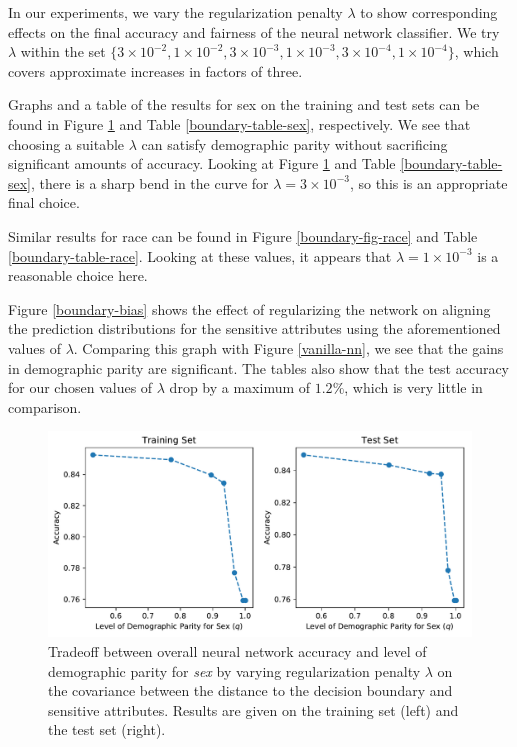 \documentclass{article}
\begin{document}
In our experiments, we vary the regularization penalty $\lambda$ to show corresponding effects on the final accuracy and fairness of the neural network classifier.  We try $\lambda$ within the set $\{3 \times 10^{-2}, 1 \times 10^{-2}, 3 \times 10^{-3}, 1 \times 10^{-3}, 3 \times 10^{-4}, 1 \times 10^{-4}\}$, which covers approximate increases in factors of three.  

Graphs and a table of the results for sex on the training and test sets can be found in Figure \ref{boundary-fig-sex} and Table \ref{boundary-table-sex}, respectively.  We see that choosing a suitable $\lambda$ can satisfy demographic parity without sacrificing significant amounts of accuracy.  Looking at Figure \ref{boundary-fig-sex} and Table \ref{boundary-table-sex}, there is a sharp bend in the curve for $\lambda = 3 \times 10^{-3}$, so this is an appropriate final choice.

Similar results for race can be found in Figure \ref{boundary-fig-race} and Table \ref{boundary-table-race}.  Looking at these values, it appears that $\lambda = 1 \times 10^{-3}$ is a reasonable choice here.  

Figure \ref{boundary-bias} shows the effect of regularizing the network on aligning the prediction distributions for the sensitive attributes using the aforementioned values of $\lambda$.  Comparing this graph with Figure \ref{vanilla-nn}, we see that the gains in demographic parity are significant.  The tables also show that the test accuracy for our chosen values of $\lambda$ drop by a maximum of $1.2\%$, which is very little in comparison.

\begin{figure}[ht]
\vskip 0.2in
\begin{center}
\centerline{\includegraphics[width=\columnwidth]{img/boundary-tradeoff-sex.pdf}}
\caption{Tradeoff between overall neural network accuracy and level of demographic parity for \emph{sex} by varying regularization penalty $\lambda$ on the covariance between the distance to the decision boundary and sensitive attributes.  Results are given on the training set (left) and the test set (right).}
\label{boundary-fig-sex}
\end{center}
\vskip -0.2in
\end{figure}
\end{document}
